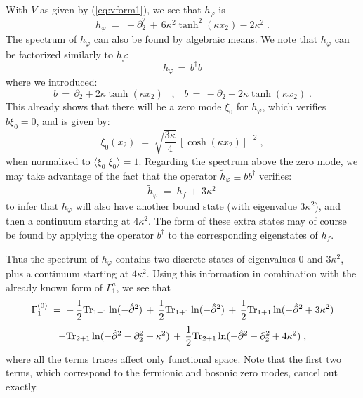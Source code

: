 \documentclass[a4paper,12pt]{article}
\begin{document}
With $V$ as given by (\ref{eq:vform1}), we see that $h_\varphi$ is
\begin{equation}
h_\varphi \;=\; -\partial_2^2 \,+\, 6 \kappa^2 \tanh^2(\kappa x_2) - 2 \kappa^2 \;.
\end{equation}
The spectrum of $h_\varphi$ can also be found  by algebraic means.
We note that $h_\varphi$ can be factorized similarly to $h_f$:
\begin{equation}\label{eq:hphif}
h_\varphi \,=\, b^\dagger b 
\end{equation}
where we introduced: 
\begin{equation}
b \,=\, \partial_2 + 2 \kappa \tanh (\kappa x_2) \;\;\;,\;\;\;
b \,=\, -\partial_2 + 2 \kappa \tanh (\kappa x_2) \;.
\end{equation}
This already shows that there will be a zero mode $\xi_0$ for $h_\varphi$,
which verifies $b \xi_0 =0$, and is given by:
\begin{equation}\label{eq:phiz}
\xi_0(x_2)\;=\; \sqrt{\frac{3 \kappa}{4}} \, [\cosh (\kappa x_2)]^{-2}\;,
\end{equation}
when normalized to $\langle\xi_0|\xi_0\rangle =1$. Regarding the spectrum above the zero mode, we may take advantage of the fact that the operator 
${\tilde h}_\varphi \equiv b b^\dagger$ verifies:
\begin{equation}
{\tilde h}_\varphi \;=\; h_f \,+\, 3 \kappa^2 \,
\end{equation}
to infer that $h_\varphi$ will also have another bound state (with 
eigenvalue $3 \kappa^2$), and then a continuum starting at $4 \kappa^2$.
The form of these extra states may of course be found by applying
the operator $b^\dagger$ to the corresponding eigenstates of $h_f$. 

Thus the spectrum of $h_\varphi$ contains  two discrete states of 
eigenvalues $0$ and $3 \kappa^2$, plus a continuum starting at
$4 \kappa^2$.
Using this information in combination with the already known form of
$\Gamma_1^a$, we see that
$$
\Gamma_1^{(0)}\;=\; - \,\frac{1}{2} {\rm Tr}_{1+1}\ln(-{\hat\partial}^2)
\,+\,\frac{1}{2} {\rm Tr}_{1+1}\ln(-{\hat\partial}^2)
\,+\,\frac{1}{2} {\rm Tr}_{1+1}\ln(-{\hat\partial}^2 + 3 \kappa^2)
$$
\begin{equation}
-{\rm Tr}_{2+1}\ln(-{\hat \partial}^2 - \partial_2^2 + \kappa^2) 
\,+\, \frac{1}{2}{\rm Tr}_{2+1}\ln(-{\hat \partial}^2 - \partial_2^2 + 4 \kappa^2) \;, 
\end{equation}
where all the terms traces affect only functional space.
Note that the first two terms, which correspond to the fermionic
and bosonic zero modes, cancel out exactly. 
\end{document}

